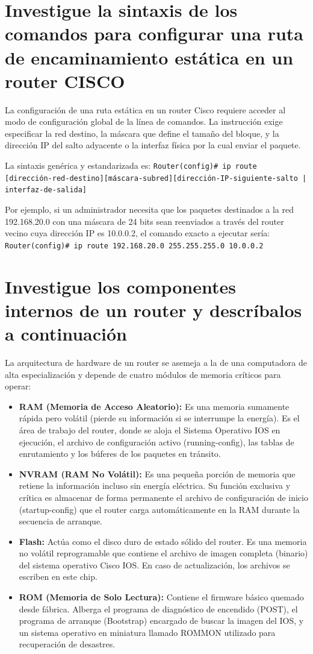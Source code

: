 \documentclass[a4paper,12pt]{article}
\begin{document}
\section{Investigue la sintaxis de los comandos para configurar una ruta de encaminamiento estática en un router CISCO}

La configuración de una ruta estática en un router Cisco requiere acceder al modo de configuración global de la línea de comandos. La instrucción exige especificar la red destino, la máscara que define el tamaño del bloque, y la dirección IP del salto adyacente o la interfaz física por la cual enviar el paquete.

La sintaxis genérica y estandarizada es:
\texttt{Router(config)\# ip route [dirección-red-destino][máscara-subred][dirección-IP-siguiente-salto | interfaz-de-salida]}

Por ejemplo, si un administrador necesita que los paquetes destinados a la red 192.168.20.0 con una máscara de 24 bits sean reenviados a través del router vecino cuya dirección IP es 10.0.0.2, el comando exacto a ejecutar sería:
\texttt{Router(config)\# ip route 192.168.20.0 255.255.255.0 10.0.0.2}

\section{Investigue los componentes internos de un router y descríbalos a continuación}

La arquitectura de hardware de un router se asemeja a la de una computadora de alta especialización y depende de cuatro módulos de memoria críticos para operar:
\begin{itemize}
\item \textbf{RAM (Memoria de Acceso Aleatorio):} Es una memoria sumamente rápida pero volátil (pierde su información si se interrumpe la energía). Es el área de trabajo del router, donde se aloja el Sistema Operativo IOS en ejecución, el archivo de configuración activo (running-config), las tablas de enrutamiento y los búferes de los paquetes en tránsito.
\item \textbf{NVRAM (RAM No Volátil):} Es una pequeña porción de memoria que retiene la información incluso sin energía eléctrica. Su función exclusiva y crítica es almacenar de forma permanente el archivo de configuración de inicio (startup-config) que el router carga automáticamente en la RAM durante la secuencia de arranque.
\item \textbf{Flash:} Actúa como el disco duro de estado sólido del router. Es una memoria no volátil reprogramable que contiene el archivo de imagen completa (binario) del sistema operativo Cisco IOS. En caso de actualización, los archivos se escriben en este chip.
\item \textbf{ROM (Memoria de Solo Lectura):} Contiene el firmware básico quemado desde fábrica. Alberga el programa de diagnóstico de encendido (POST), el programa de arranque (Bootstrap) encargado de buscar la imagen del IOS, y un sistema operativo en miniatura llamado ROMMON utilizado para recuperación de desastres.
\end{itemize}
\end{document}
